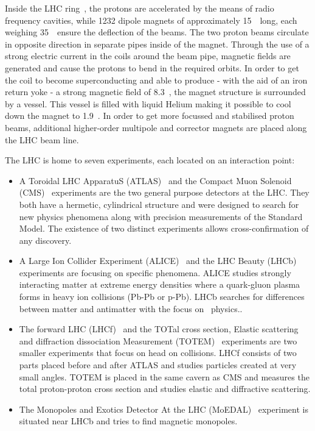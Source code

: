 Inside the LHC ring~\cite{Bruning:782076}, the protons are accelerated by the means of radio frequency cavities, while 1232 dipole magnets of approximately 15~\m\ long, each weighing 35~\tonne\, ensure the deflection of the beams.  The two proton beams circulate in opposite direction in separate pipes inside of the magnet. Through the use of a strong electric current in the coils around the beam pipe, magnetic fields are generated and cause the protons to bend in the required orbits. In order to get the coil to become superconducting and able to produce - with the aid of an iron return yoke - a strong magnetic field of 8.3~\tesla, the magnet structure is surrounded by a vessel. This vessel is filled with liquid Helium making it possible to cool down the magnet to 1.9~\kelvin. In order to get more focussed and stabilised proton beams, additional higher-order multipole and corrector magnets are placed along the LHC beam line.

  

The LHC is home to seven experiments, each located on an interaction point: 
\begin{itemize}
	\item A Toroidal LHC ApparatuS (ATLAS)~\cite{Aad:2008zzm} and the Compact Muon Solenoid (CMS)~\cite{Chatrchyan:2008aa} experiments are the two general purpose detectors at the LHC. They both have a hermetic, cylindrical structure and were designed to search for new physics phenomena along with precision measurements of the Standard Model. The existence of two distinct experiments allows cross-confirmation of any discovery. 
	\item A Large Ion Collider Experiment (ALICE)~\cite{Aamodt:2008zz} and the LHC Beauty (LHCb)~\cite{Alves:2008zz} experiments are focusing on specific phenomena. ALICE studies strongly interacting matter at extreme energy densities where a quark-gluon plasma forms in heavy ion collisions (Pb-Pb or p-Pb). LHCb searches for differences between matter and antimatter with the focus on \Pbottom\ physics..
	\item The forward LHC (LHCf)~\cite{Bongi:2010zz} and the TOTal cross section, Elastic scattering and diffraction dissociation Measurement (TOTEM)~\cite{Anelli:2008zza} experiments are two smaller experiments that focus on head on collisions. LHCf consists of two parts placed before and after ATLAS and studies particles created at very small angles. TOTEM is placed in the same cavern as CMS and measures the total proton-proton cross section and studies elastic and diffractive scattering.  
		\item The Monopoles and Exotics Detector At the LHC (MoEDAL)~\cite{Acharya:2014nyr} experiment is situated near LHCb and tries to find magnetic monopoles. 
\end{itemize}



